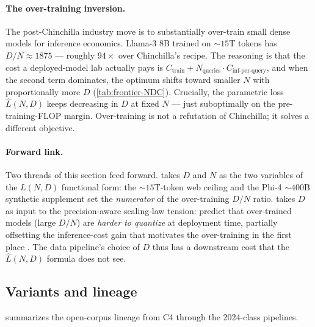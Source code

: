 \paragraph{The over-training inversion.}
The post-Chinchilla industry move is to substantially over-train
small dense models for inference economics. Llama-3 8B trained on
$\sim\!15$T tokens \citep{meta-llama3} has $D / N \approx 1875$
--- roughly $94\times$ over Chinchilla's recipe. The reasoning is
that the cost a deployed-model lab actually pays is
$C_{\text{train}} + N_{\text{queries}} \cdot C_{\text{inf-per-query}}$,
and when the second term dominates, the optimum shifts toward
smaller $N$ with proportionally more $D$
(\cref{tab:frontier-NDC}). Crucially, the parametric loss
$\hat{L}(N, D)$ keeps decreasing in $D$ at fixed $N$ --- just
suboptimally on the pre-training-FLOP margin. Over-training is not
a refutation of Chinchilla; it solves a different objective.

\paragraph{Forward link.}
Two threads of this section feed forward. 
takes $D$ and $N$ as the two variables of the
$L(N, D)$ functional form: the  $\sim 15$T-token web
ceiling and the Phi-4 $\sim 400$B synthetic supplement set the
\emph{numerator} of the over-training $D / N$ ratio.
 takes $D$ as input to the
precision-aware scaling-law tension: \citet{scaling-laws-precision-2024}
predict that over-trained models (large $D / N$) are
\emph{harder to quantize} at deployment time, partially offsetting
the inference-cost gain that motivates the over-training in the
first place \citep[\S 4]{scaling-laws-precision-2024}. The data
pipeline's choice of $D$ thus has a downstream cost that the
$\hat{L}(N, D)$ formula does not see.

\subsection{Variants and lineage}
\label{sec:data-lineage}

 summarizes the open-corpus lineage from C4
through the 2024-class pipelines.

